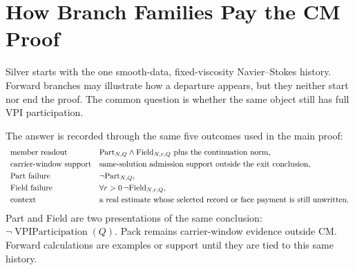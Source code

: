 \section{How Branch Families Pay the CM Proof}
\label{sec:branch-proof-roles}

Silver starts with the one smooth-data, fixed-viscosity Navier--Stokes history.
Forward branches may illustrate how a departure appears, but they neither
start nor end the proof.  The common question is whether the same object still
has full VPI participation.

The answer is recorded through the same five outcomes used in the main proof:
\[
\begin{array}{ll}
\text{member readout} &
  \mathrm{Part}_{N,Q}\wedge\mathrm{Field}_{N,r,Q}
  \text{ plus the continuation norm,}\\[1mm]
\text{carrier-window support} & \text{same-solution admission support outside the exit conclusion},\\[1mm]
\text{Part failure} & \neg\mathrm{Part}_{N,Q},\\[1mm]
\text{Field failure} &
  \forall r>0\,\neg\mathrm{Field}_{N,r,Q},\\[1mm]
\text{context} &
  \text{a real estimate whose selected record or face payment is still unwritten.}
\end{array}
\]
Part and Field are two presentations of the same conclusion:
\(\neg\operatorname{VPIParticipation}(Q)\).  Pack remains carrier-window
evidence outside CM.  Forward calculations are examples or support until they
are tied to this same history.

